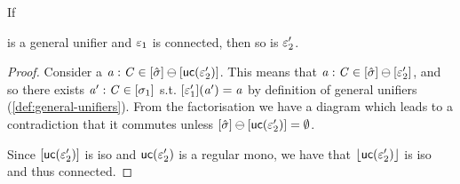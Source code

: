 \begin{lemma}\label{lem:general-unifier-con-prop}
    If 
    is a general unifier and $\varepsilon_1$ is connected, then so is $\varepsilon_2'$.
\end{lemma}
\begin{proof}
    Consider a $\mathit{a} : \mathit{C} \in [\hat\sigma] \ominus [\mathsf{uc}(\varepsilon_2')]$.
    This means that $\mathit{a} : \mathit{C} \in [\hat\sigma] \ominus [\varepsilon_2']$, and so there exists $\mathit{a}' : \mathit{C} \in [\sigma_1]$ s.t.
    $[\varepsilon_1'](\mathit{a}') = \mathit{a}$ by definition of general unifiers (\cref{def:general-unifiers}).
    From the factorisation we have a diagram which leads to a contradiction that it commutes unless $[\hat\sigma] \ominus [\mathsf{uc}(\varepsilon_2')] = \emptyset$.
    \begin{center}
    \end{center}
    Since $[\mathsf{uc}(\varepsilon_2')]$ is iso and $\mathsf{uc}(\varepsilon_2')$ is a regular mono, we have that $\lfloor\mathsf{uc}(\varepsilon_2')\rfloor$ is iso and thus connected.
\end{proof}



